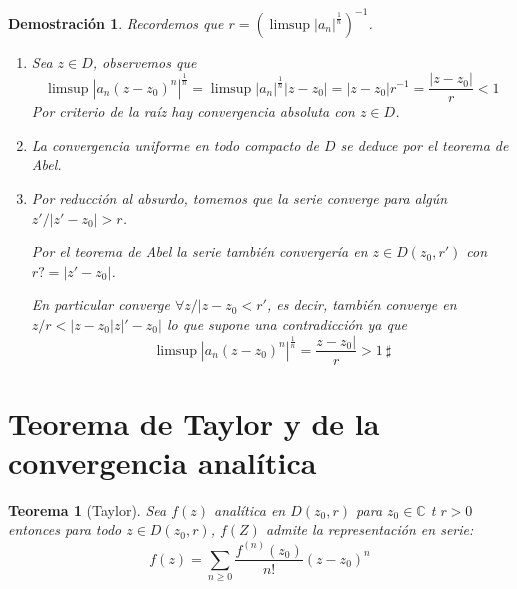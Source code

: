 \documentclass[10pt]{book}
\newtheorem{theorem}{Teorema}[chapter]
\newtheorem*{dem}{Demostración}
\newcommand{\C}{\mathbb{C}}
\begin{document}
\begin{dem}
Recordemos que $r = \left(\limsup|a_n|^{\frac{1}{n}}\right)^{-1}$.
\begin{enumerate} 
\item Sea $z\in  D$, observemos que 
$$\limsup|a_n(z-z_0)^n|^{\frac{1}{n}} = \limsup|a_n|^{\frac{1}{n}}|z-z_0| = |z-z_0|r^{-1} = \frac{|z-z_0|}{r}< 1 $$
Por criterio de la raíz hay convergencia absoluta con $z\in D$.

\item La convergencia uniforme en todo compacto de $D$ se deduce por el teorema de Abel.

\item Por reducción al absurdo, tomemos que la serie converge para algún $z' / |z'-z_0|>r$.

Por el teorema de Abel la serie también convergería en $z\in D(z_0,r')$ con $r? = |z'-z_0|$.

En particular converge $\forall z / |z-z_0 <r'$, es decir, también converge en $z/ r<|z-z_0|z|'-z_0|$ lo que supone una contradicción ya que 
$$\limsup|a_n(z-z_0)^n|^{\frac{1}{n}} = \frac{z-z_0|}{r}>1\ \sharp$$
\end{enumerate}
\end{dem}


\section{Teorema de Taylor y de la convergencia analítica}


\begin{theorem}[Taylor]
Sea $f(z)$ analítica en $D(z_0,r)$ para $z_0\in\C$ t $r>0$ entonces para todo $z \in D(z_0,r)$, $f(Z)$ admite la representación en serie:
$$f(z) = \sum_{n\geq 0} \frac{f^{(n)}(z_0)}{n!}(z-z_0)^n$$
\end{theorem}
\end{document}
